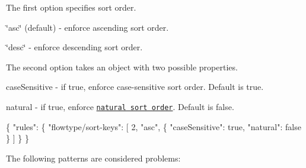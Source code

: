 The first option specifies sort order.


\begin{DoxyItemize}
\item {\ttfamily \char`\"{}asc\char`\"{}} (default) -\/ enforce ascending sort order.
\item {\ttfamily \char`\"{}desc\char`\"{}} -\/ enforce descending sort order.
\end{DoxyItemize}

The second option takes an object with two possible properties.


\begin{DoxyItemize}
\item {\ttfamily case\+Sensitive} -\/ if {\ttfamily true}, enforce case-\/sensitive sort order. Default is {\ttfamily true}.
\item {\ttfamily natural} -\/ if {\ttfamily true}, enforce \href{https://en.wikipedia.org/wiki/Natural_sort_order}{\tt natural sort order}. Default is {\ttfamily false}.
\end{DoxyItemize}


\begin{DoxyCode}
\{
  "rules": \{
    "flowtype/sort-keys": [
      2,
      "asc", \{
        "caseSensitive": true,
        "natural": false
      \}
    ]
  \}
\}
\end{DoxyCode}


The following patterns are considered problems\+:



